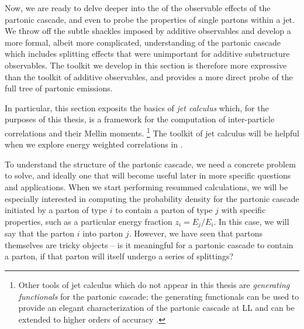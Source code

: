 Now, we are ready to delve deeper into the of the observable effects of the partonic cascade, and even to probe the properties of single partons within a jet.
%
We throw off the subtle shackles imposed by additive observables and develop a more formal, albeit more complicated, understanding of the partonic cascade which includes splitting effects that were unimportant for additive substructure observables.
%
The toolkit we develop in this section is therefore more expressive than the toolkit of additive observables, and provides a more direct probe of the full tree of partonic emissions.


In particular, this section exposits the basics of \textit{jet calculus} \cite{Konishi:1978dg,Konishi:1978yx,Konishi:1978ks} which, for the purposes of this thesis, is a framework for the computation of inter-particle correlations and their Mellin moments.%
\footnote{
    Other tools of jet calculus which do not appear in this thesis are \textit{generating functionals} for the partonic cascade;
    the generating functionals can be used to provide an elegant characterization of the partonic cascade at LL and can be extended to higher orders of accuracy \cite{vanBeekveld:2023lsa}.
}
%
The toolkit of jet calculus will be helpful when we explore energy weighted correlations in .



To understand the structure of the partonic cascade, we need a concrete problem to solve, and ideally one that will become useful later in more specific questions and applications.
%
When we start performing resummed calculations, we will be especially interested in computing the probability density for the partonic cascade initiated by a parton of type \(i\) to contain a parton of type \(j\) with specific properties, such as a particular energy fraction \(z_i = E_j/E_i\).
%
In this case, we will say that the parton \(i\)  into parton \(j\).
%
However, we have seen that partons themselves are tricky objects -- is it meaningful for a partonic cascade to contain a parton, if that parton will itself undergo a series of splittings?


